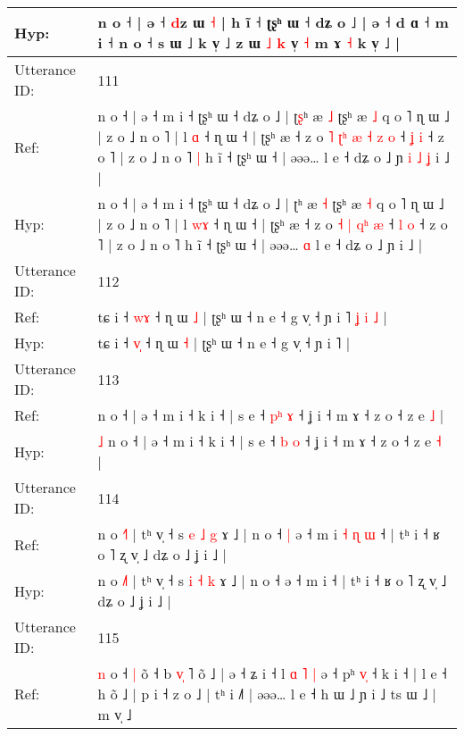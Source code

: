 \documentclass[10pt]{article}
\DeclareRobustCommand{\hl}[1]{{\textcolor{red}{#1}}}
\begin{document}
\begin{longtable}{ll}
 \\
Hyp: & n o ˧ | ə ˧ \hl{d}z ɯ \hl{˧} | h ĩ ˧ ʈʂʰ ɯ ˧ dʑ o ˩ | ə ˧ d ɑ\hl{}\hl{}\hl{}\hl{} ˧ m i ˧\hl{}\hl{} n o ˧ s ɯ ˩ k v̩ ˩\hl{}\hl{} z ɯ \hl{˩} \hl{k} v̩ \hl{˧} m ɤ \hl{˧} k v̩ ˩ |
 \\
\midrule
Utterance ID: & 111 \\
Ref: & n o ˧ | ə ˧ m i ˧ ʈʂʰ ɯ ˧ dʑ o ˩ | ʈ\hl{ʂ}ʰ æ \hl{˩} ʈʂʰ æ \hl{˩} q o ˥ ɳ ɯ ˩ | z o ˩ n o ˥ | l \hl{}\hl{ɑ} ˧ ɳ ɯ ˧ | ʈʂʰ æ ˧ z o\hl{ }\hl{˥} \hl{ʈ}\hl{ʰ} \hl{æ} \hl{˧}\hl{ }\hl{z} \hl{o} ˧ \hl{ʝ} \hl{i} ˧ z o ˥ | z o ˩ n o ˥\hl{ }\hl{|} h ĩ ˧ ʈʂʰ ɯ ˧ | əəə…\hl{}\hl{} l e ˧ dʑ o ˩ ɲ\hl{ }\hl{i}\hl{ }\hl{˩}\hl{ }\hl{ʝ} i ˩ |
 \\
Hyp: & n o ˧ | ə ˧ m i ˧ ʈʂʰ ɯ ˧ dʑ o ˩ | ʈ\hl{}ʰ æ \hl{˧} ʈʂʰ æ \hl{˧} q o ˥ ɳ ɯ ˩ | z o ˩ n o ˥ | l \hl{w}\hl{ɤ} ˧ ɳ ɯ ˧ | ʈʂʰ æ ˧ z o\hl{}\hl{} \hl{}\hl{˧} \hl{|} \hl{}\hl{q}\hl{ʰ} \hl{æ} ˧ \hl{l} \hl{o} ˧ z o ˥ | z o ˩ n o ˥\hl{}\hl{} h ĩ ˧ ʈʂʰ ɯ ˧ | əəə…\hl{ }\hl{ɑ} l e ˧ dʑ o ˩ ɲ\hl{}\hl{}\hl{}\hl{}\hl{}\hl{} i ˩ |
 \\
\midrule
Utterance ID: & 112 \\
Ref: & tɕ i ˧ \hl{w}\hl{ɤ} ˧ ɳ ɯ \hl{˩} | ʈʂʰ ɯ ˧ n e ˧ g v̩ ˧ ɲ i ˥\hl{ }\hl{ʝ}\hl{ }\hl{i}\hl{ }\hl{˩} |
 \\
Hyp: & tɕ i ˧ \hl{v}\hl{̩} ˧ ɳ ɯ \hl{˧} | ʈʂʰ ɯ ˧ n e ˧ g v̩ ˧ ɲ i ˥\hl{}\hl{}\hl{}\hl{}\hl{}\hl{} |
 \\
\midrule
Utterance ID: & 113 \\
Ref: & \hl{}\hl{}n o ˧ | ə ˧ m i ˧ k i ˧ | s e ˧ \hl{p}\hl{ʰ} \hl{ɤ} ˧ ʝ i ˧ m ɤ ˧ z o ˧ z e \hl{˩} |
 \\
Hyp: & \hl{˩}\hl{ }n o ˧ | ə ˧ m i ˧ k i ˧ | s e ˧ \hl{}\hl{b} \hl{o} ˧ ʝ i ˧ m ɤ ˧ z o ˧ z e \hl{˧} |
 \\
\midrule
Utterance ID: & 114 \\
Ref: & n o \hl{˧}˥ | tʰ v̩ ˧ s \hl{e} \hl{˩} \hl{g} ɤ ˩ | n o ˧\hl{ }\hl{|} ə ˧ m i\hl{ }\hl{˧}\hl{ }\hl{ɳ}\hl{ }\hl{ɯ} ˧ | tʰ i ˧ ʁ o ˥ ʐ v̩ ˩ dʑ o ˩ ʝ i ˩ |
 \\
Hyp: & n o \hl{˩}˥ | tʰ v̩ ˧ s \hl{i} \hl{˧} \hl{k} ɤ ˩ | n o ˧\hl{}\hl{} ə ˧ m i\hl{}\hl{}\hl{}\hl{}\hl{}\hl{} ˧ | tʰ i ˧ ʁ o ˥ ʐ v̩ ˩ dʑ o ˩ ʝ i ˩ |
 \\
\midrule
Utterance ID: & 115 \\
Ref: & \hl{n} o ˧\hl{ }\hl{|} õ ˧ b \hl{v}\hl{̩} ˥ õ ˩ | ə ˧ ʑ i ˧ l\hl{ }\hl{ɑ} \hl{˥} \hl{|} ə ˧ pʰ \hl{v}\hl{̩} ˧ k i\hl{}\hl{} ˧ | l e ˧ h õ ˩ | p i ˧ z o ˩ | tʰ i ˩˥ | əəə… l e ˧ h ɯ ˩ ɲ i ˩ ts ɯ ˩ | m v̩ ˩
 \\

\end{longtable}
\end{document}
